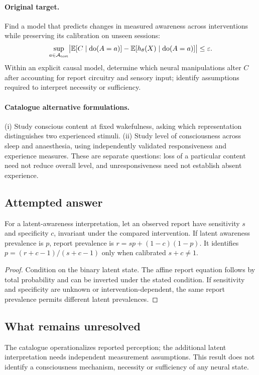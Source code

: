 \documentclass[11pt]{article}
\begin{document}
\paragraph{Original target.}
Find a model that predicts changes in measured awareness across interventions while preserving its calibration on unseen sessions:
\[
\sup_{a\in\mathcal A_{\rm test}}\bigl|\mathbb{E}[C\mid\operatorname{do}(A=a)]-\mathbb{E}[h_\theta(X)\mid\operatorname{do}(A=a)]\bigr|\leq\varepsilon.
\]
Within an explicit causal model, determine which neural manipulations alter $C$ after accounting for report circuitry and sensory input; identify assumptions required to interpret necessity or sufficiency.
\paragraph{Catalogue alternative formulations.}
(i) Study conscious content at fixed wakefulness, asking which representation distinguishes two experienced stimuli. (ii) Study level of consciousness across sleep and anaesthesia, using independently validated responsiveness and experience measures. These are separate questions: loss of a particular content need not reduce overall level, and unresponsiveness need not establish absent experience.
\subsection{Attempted answer}
\begin{proposition}
For a latent-awareness interpretation, let an observed report have sensitivity $s$ and specificity $c$, invariant under the compared intervention. If latent awareness prevalence is $p$, report prevalence is $r=sp+(1-c)(1-p)$. It identifies $p=(r+c-1)/(s+c-1)$ only when calibrated $s+c\ne1$.
\end{proposition}
\begin{proof}
Condition on the binary latent state. The affine report equation follows by total probability and can be inverted under the stated condition. If sensitivity and specificity are unknown or intervention-dependent, the same report prevalence permits different latent prevalences.
\end{proof}
\subsection{What remains unresolved}
The catalogue operationalizes reported perception; the additional latent interpretation needs independent measurement assumptions. This result does not identify a consciousness mechanism, necessity or sufficiency of any neural state.
\end{document}
